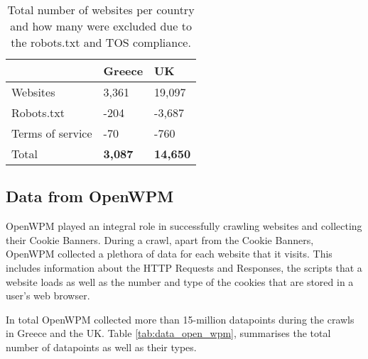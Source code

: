 \documentclass[../main.tex]{subfiles}
\begin{document}
\begin{table}[ht]
    \centering
    \begin{tabular}{@{}lll@{}}
    \toprule
                     & Greece & UK              \\ \midrule
    Websites         & 3,361  & 19,097          \\
    Robots.txt       & -204   & -3,687          \\
    Terms of service & -70    & -760            \\
    Total            & \textbf{3,087}  & \textbf{14,650} \\ \bottomrule
    \end{tabular}
    \caption{Total number of websites per country and how many were excluded due to the robots.txt and TOS compliance.}
    \label{tab:data_websites}
\end{table}

\subsection{Data from OpenWPM}
OpenWPM played an integral role in successfully crawling websites and collecting their Cookie Banners. During a crawl, apart from the Cookie Banners, OpenWPM collected a plethora of data for each website that it visits. This includes information about the HTTP Requests and Responses, the scripts that a website loads as well as the number and type of the cookies that are stored in a user’s web browser.

In total OpenWPM collected more than 15-million datapoints during the crawls in Greece and the UK. Table \ref{tab:data_open_wpm}, summarises the total number of datapoints as well as their types. 
\end{document}
